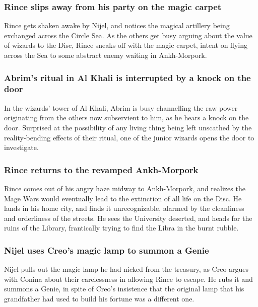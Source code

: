 \subsubsection{\Gls{Rince} slips away from his party on the magic carpet}
\Gls{Rince} gets shaken awake by \Gls{Nijel}, and notices the magical artillery being exchanged
across the Circle Sea. As the others get busy arguing about the value of wizards to the Disc,
\Gls{Rince} sneaks off with the magic carpet, intent on flying across the Sea to some abstract
enemy waiting in Ankh-Morpork.

\subsubsection{\Gls{Abrim}'s ritual in Al Khali is interrupted by a knock on the door}
In the wizards' tower of Al Khali, \Gls{Abrim} is busy channelling the raw power originating from
the others now subservient to him, as he hears a knock on the door. Surprised at the possibility
of any living thing being left unscathed by the reality-bending effects of their ritual, one of the
junior wizards opens the door to investigate.

\subsubsection{\Gls{Rince} returns to the revamped Ankh-Morpork}
\Gls{Rince} comes out of his angry haze midway to Ankh-Morpork, and realizes the Mage Wars would
eventually lead to the extinction of all life on the Disc. He lands in his home city, and finds it
unrecognizable, alarmed by the cleanliness and orderliness of the streets. He sees the University
deserted, and heads for the ruins of the Library, frantically trying to find the \Gls{Libra} in the
burnt rubble.

\subsubsection{\Gls{Nijel} uses \Gls{Creo}'s magic lamp to summon a \Gls{Genie}}
\Gls{Nijel} pulls out the magic lamp he had nicked from the treasury, as \Gls{Creo} argues with
\Gls{Conina} about their carelessness in allowing \Gls{Rince} to escape. He rubs it and summons a
\Gls{Genie}, in spite of \Gls{Creo}'s insistence that the original lamp that his grandfather had
used to build his fortune was a different one.

\subsection{}
